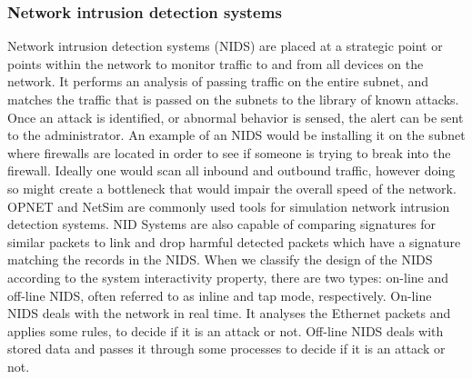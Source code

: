 \documentclass[12pt]{article}
\theoremstyle{definition}
\begin{document}
			\subsubsection{Network intrusion detection systems}
			Network intrusion detection systems (NIDS) are placed at a strategic point or points within the network to monitor traffic to and from all devices on the network. It performs an analysis of passing traffic on the entire subnet, and matches the traffic that is passed on the subnets to the library of known attacks. Once an attack is identified, or abnormal behavior is sensed, the alert can be sent to the administrator. An example of an NIDS would be installing it on the subnet where firewalls are located in order to see if someone is trying to break into the firewall. Ideally one would scan all inbound and outbound traffic, however doing so might create a bottleneck that would impair the overall speed of the network. OPNET and NetSim are commonly used tools for simulation network intrusion detection systems. NID Systems are also capable of comparing signatures for similar packets to link and drop harmful detected packets which have a signature matching the records in the NIDS. When we classify the design of the NIDS according to the system interactivity property, there are two types: on-line and off-line NIDS, often referred to as inline and tap mode, respectively. On-line NIDS deals with the network in real time. It analyses the Ethernet packets and applies some rules, to decide if it is an attack or not. Off-line NIDS deals with stored data and passes it through some processes to decide if it is an attack or not.
			
\end{document}
